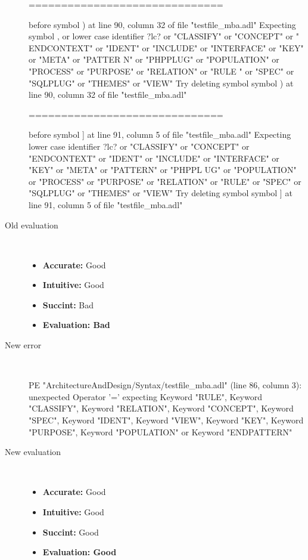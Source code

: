 \begin{description}
\begin{haskell}
==============================

before symbol ) at line 90, column 32 of file "testfile_mba.adl"
Expecting symbol , or lower case identifier ?lc? or "CLASSIFY" or "CONCEPT" or "
ENDCONTEXT" or "IDENT" or "INCLUDE" or "INTERFACE" or "KEY" or "META" or "PATTER
N" or "PHPPLUG" or "POPULATION" or "PROCESS" or "PURPOSE" or "RELATION" or "RULE
" or "SPEC" or "SQLPLUG" or "THEMES" or "VIEW"
Try deleting symbol symbol ) at line 90, column 32 of file "testfile_mba.adl"

==============================

before symbol ] at line 91, column 5 of file "testfile_mba.adl"
Expecting lower case identifier ?lc? or "CLASSIFY" or "CONCEPT" or "ENDCONTEXT"
or "IDENT" or "INCLUDE" or "INTERFACE" or "KEY" or "META" or "PATTERN" or "PHPPL
UG" or "POPULATION" or "PROCESS" or "PURPOSE" or "RELATION" or "RULE" or "SPEC"
or "SQLPLUG" or "THEMES" or "VIEW"
Try deleting symbol symbol ] at line 91, column 5 of file "testfile_mba.adl"
\end{haskell}
  \item[Old evaluation]~\\
    \begin{itemize}
    \item \textbf{Accurate:} Good
    \item \textbf{Intuitive:} Good
    \item \textbf{Succint:} Bad
    \item \textbf{Evaluation: Bad}
    \end{itemize}
  \item[New error]~\\
\begin{haskell}
PE "ArchitectureAndDesign/Syntax/testfile_mba.adl" (line 86, column 3):
unexpected Operator '='
expecting Keyword "RULE", Keyword "CLASSIFY", Keyword "RELATION", Keyword "CONCEPT", Keyword "SPEC", Keyword "IDENT", Keyword "VIEW", Keyword "KEY", Keyword "PURPOSE", Keyword "POPULATION" or Keyword "ENDPATTERN"\end{haskell}
  \item[New evaluation]~\\
    \begin{itemize}
    \item \textbf{Accurate:} Good
    \item \textbf{Intuitive:} Good
    \item \textbf{Succint:} Good
    \item \textbf{Evaluation: Good
}
    \end{itemize}
  \end{description}

